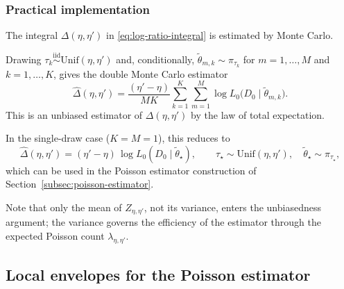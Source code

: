 \subsubsection{Practical implementation}

The integral $\Delta(\eta,\eta')$ in \eqref{eq:log-ratio-integral} is estimated by Monte Carlo.

Drawing $\tau_k \overset{\mathrm{iid}}{\sim} \mathrm{Unif}(\eta,\eta')$ and, conditionally, $\widetilde{\theta}_{m,k} \sim \pi_{\tau_k}$ for $m = 1,\ldots,M$ and $k = 1,\ldots,K$, gives the double Monte Carlo estimator
\begin{equation}
    \widehat{\Delta}(\eta, \eta')
    =
    \frac{(\eta' - \eta)}{MK}
    \sum_{k=1}^{K} \sum_{m=1}^{M}
    \log L_0\bigl(D_0 \mid \widetilde{\theta}_{m,k}\bigr).
\end{equation}
This is an unbiased estimator of $\Delta(\eta,\eta')$ by the law of total expectation.

In the single-draw case ($K = M = 1$), this reduces to
\begin{equation}
    \label{eq:single-draw-delta}
    \widehat{\Delta}(\eta, \eta') = (\eta' - \eta)\,\log L_0(D_0 \mid \widetilde{\theta}_\star),
    \qquad
    \tau_\star \sim \mathrm{Unif}(\eta,\eta'),
    \quad
    \widetilde{\theta}_\star \sim \pi_{\tau_\star},
\end{equation}
which can be used in the Poisson estimator construction of Section~\ref{subsec:poisson-estimator}.

Note that only the mean of $Z_{\eta,\eta'}$, not its variance, enters the unbiasedness argument; the variance governs the efficiency of the estimator through the expected Poisson count $\lambda_{\eta,\eta'}$.

\subsection{Local envelopes for the Poisson estimator}
\label{subsec:local-envelopes}

